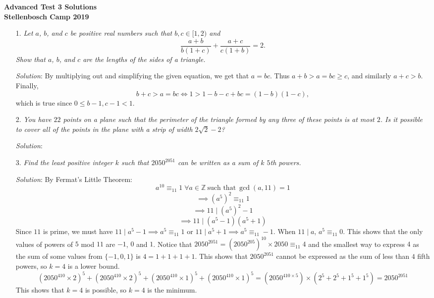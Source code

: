 \documentclass{article}
\begin{document}
\begin{center}
  \textbf{\Large Advanced Test 3 Solutions}
  \\ \vspace{1em}
  \textbf{\large Stellenbosch Camp 2019}
\end{center}

\vspace{12pt}


\begin{enumerate}

\item[1.] %
{\itshape
Let $a$, $b$, and $c$ be positive real numbers such that $b, c \in [1,2)$ and
\[ \frac{a+b}{b(1+c)} +\frac{a+c}{c(1+b)} = 2. \]
Show that $a$, $b$, and $c$ are the lengths of the sides of a triangle. 
}

\textit{Solution}:
By multiplying out and simplifying the given equation, we get that $a = bc$.
Thus $a + b > a = bc \geq c$, and similarly $a+c > b$.
Finally,
\[ b+c > a = bc \iff 1 > 1 -b -c +bc = (1-b)(1-c), \]
which is true since $0 \leq b-1, c-1 < 1$.


\item[2.] %
{\itshape
You have $22$ points on a plane such that the perimeter of the triangle formed by any three of these points is at most $2$. Is it possible to cover all of the points in the plane with a strip of width $2\sqrt{2} - 2$?
}

\textit{Solution}:


\item[3.] %
{\itshape
Find the least positive integer $k$ such that $2050^{2051}$ can be written as a sum of $k$ $5$th powers.
}

\textit{Solution}:
By Fermat's Little Theorem: 
$$a^{10} \equiv _{11} 1 \; \forall a \in \mathbb{Z} \ \text{such that}\ \gcd(a, 11) = 1$$ 
$$\implies (a^5)^2 \equiv _{11} 1$$
$$\implies 11 \mid (a^5)^2 - 1$$
$$\implies 11 \mid (a^5 - 1)(a^5 + 1)$$
Since $11$ is prime, we must have $11 \mid a^5 - 1 \implies a^5 \equiv _{11} 1$ or $11 \mid a^5 + 1 \implies a^5 \equiv _{11} -1$. When $11 \mid a$, $a^5 \equiv _{11} 0$.
This shows that the only values of powers of $5$ mod $11$ are $-1$, $0$ and $1$. Notice that $2050^{2051} = (2050^{205})^{10} \times 2050 \equiv _{11} 4$ and the smallest way to express $4$ as the sum of some values from $\{-1, 0, 1\}$ is $4 = 1 + 1 + 1 + 1$.
This shows that $2050^{2051}$ cannot be expressed as the sum of less than $4$ fifth powers, so $k = 4$ is a lower bound.
$$(2050^{410} \times 2)^5 + (2050^{410} \times 2)^5 + (2050^{410} \times 1)^5 + (2050^{410} \times 1)^5 = (2050^{410 \times 5}) \times (2^5 + 2^5 + 1^5 + 1^5) = 2050^{2051}$$
This shows that $k = 4$ is possible, so $k = 4$ is the minimum.



\end{enumerate}
\end{document}
